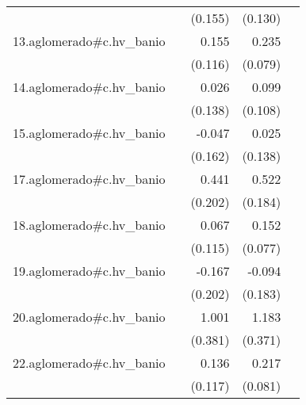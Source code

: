 {\begin{longtable}{l*{4}{D{.}{.}{-1}}}
            &                     &     (0.155)         &     (0.130)         &                     \\
\addlinespace
13.aglomerado#c.hv\_banio&                     &       0.155         &       0.235\sym{**} &                     \\
            &                     &     (0.116)         &     (0.079)         &                     \\
\addlinespace
14.aglomerado#c.hv\_banio&                     &       0.026         &       0.099         &                     \\
            &                     &     (0.138)         &     (0.108)         &                     \\
\addlinespace
15.aglomerado#c.hv\_banio&                     &      -0.047         &       0.025         &                     \\
            &                     &     (0.162)         &     (0.138)         &                     \\
\addlinespace
17.aglomerado#c.hv\_banio&                     &       0.441\sym{*}  &       0.522\sym{**} &                     \\
            &                     &     (0.202)         &     (0.184)         &                     \\
\addlinespace
18.aglomerado#c.hv\_banio&                     &       0.067         &       0.152\sym{*}  &                     \\
            &                     &     (0.115)         &     (0.077)         &                     \\
\addlinespace
19.aglomerado#c.hv\_banio&                     &      -0.167         &      -0.094         &                     \\
            &                     &     (0.202)         &     (0.183)         &                     \\
\addlinespace
20.aglomerado#c.hv\_banio&                     &       1.001\sym{**} &       1.183\sym{**} &                     \\
            &                     &     (0.381)         &     (0.371)         &                     \\
\addlinespace
22.aglomerado#c.hv\_banio&                     &       0.136         &       0.217\sym{**} &                     \\
            &                     &     (0.117)         &     (0.081)         &                     \\

\end{longtable}}
